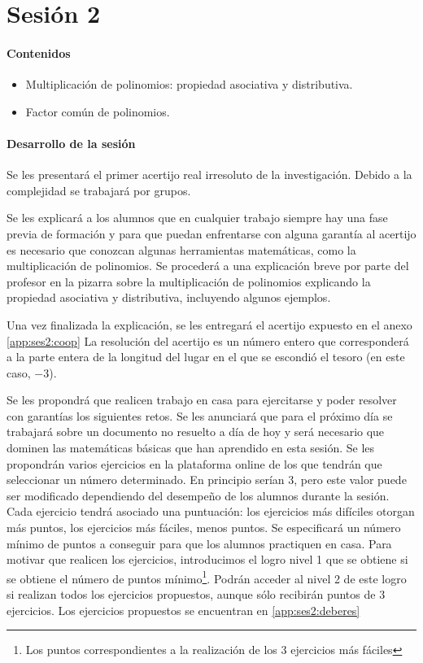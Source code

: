 \section{Sesión 2}



\paragraph{Contenidos}
\begin{itemize}
	\item Multiplicación de polinomios: propiedad asociativa y distributiva.
	\item Factor común de polinomios.
\end{itemize}

\paragraph{Desarrollo de la sesión}

Se les presentará el primer acertijo real irresoluto de la investigación.
%
Debido a la complejidad se trabajará por grupos.

Se les explicará a los alumnos que en cualquier trabajo siempre hay una fase previa de formación y para que puedan enfrentarse con alguna garantía al acertijo es necesario que conozcan algunas herramientas matemáticas, como la multiplicación de polinomios.
%
Se procederá a una explicación breve por parte del profesor en la pizarra sobre la multiplicación de polinomios explicando la propiedad asociativa y distributiva, incluyendo algunos ejemplos.

Una vez finalizada la explicación, se les entregará el acertijo expuesto en el anexo \ref{app:ses2:coop}
%
La resolución del acertijo es un número entero que corresponderá a la parte entera de la longitud del lugar en el que se escondió el tesoro (en este caso, $-3$).



Se les propondrá que realicen trabajo en casa para ejercitarse y poder resolver con garantías los siguientes retos.
%
Se les anunciará que para el próximo día se trabajará sobre un documento no resuelto a día de hoy y será necesario que dominen las matemáticas básicas que han aprendido en esta sesión.
%
Se les propondrán varios ejercicios en la plataforma online de los que tendrán que seleccionar un número determinado. 
%
En principio serían 3, pero este valor puede ser modificado dependiendo del desempeño de los alumnos durante la sesión.
%
Cada ejercicio tendrá asociado una puntuación: los ejercicios más difíciles otorgan más puntos, los ejercicios más fáciles, menos puntos.
%
Se especificará un número mínimo de puntos a conseguir para que los alumnos practiquen en casa. 
%
Para motivar que realicen los ejercicios, introducimos el logro  nivel 1 que se obtiene si se obtiene el número de puntos mínimo\footnote{Los puntos correspondientes a la realización de los 3 ejercicios más fáciles}.
%
Podrán acceder al nivel 2 de este logro si realizan todos los ejercicios propuestos, aunque sólo recibirán puntos de 3 ejercicios.
%
Los ejercicios propuestos se encuentran en \ref{app:ses2:deberes}

